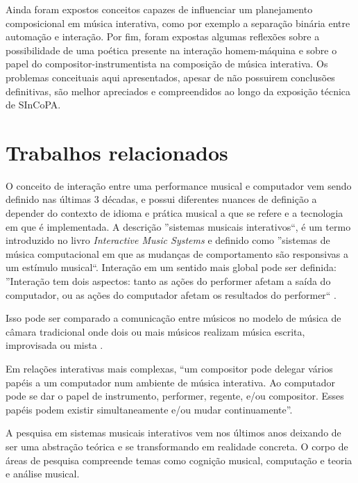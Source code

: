 \documentclass[draft]{ppgmus}
\begin{document}
Ainda foram expostos conceitos capazes de influenciar um planejamento
composicional em música interativa, como por exemplo a separação binária entre
automação e interação. Por fim, foram expostas algumas reflexões sobre a
possibilidade de uma poética presente na interação homem-máquina e sobre
o papel do compositor-instrumentista na composição de música interativa.
Os problemas conceituais aqui apresentados, apesar de não possuirem
conclusões definitivas, são melhor apreciados e compreendidos ao longo
da exposição técnica de SInCoPA.



\chapter{Trabalhos relacionados}
\label{sec:rev}

O conceito de interação entre uma performance musical e computador vem
sendo definido nas últimas 3 décadas, e possui diferentes nuances de definição
a depender do contexto de idioma e prática musical a que se refere e a tecnologia
em que é implementada. A descrição ''sistemas musicais interativos``, é um
termo introduzido no livro \textit{Interactive Music Systems} 
\cite{rowe93:interactive} e definido como ''sistemas de música 
computacional em que as mudanças de comportamento são responsivas a um
estímulo musical``. Interação em um sentido mais global pode ser definida: 
  ''Interação tem dois aspectos:
tanto as ações do performer afetam a saída do computador, ou as ações do computador
afetam os resultados do performer`` \cite{garnett:2001}.

Isso pode ser comparado a comunicação entre músicos no modelo de  música de 
câmara tradicional onde dois ou mais músicos realizam música escrita, improvisada 
ou mista \cite{winkler93:interactive}.

Em relações interativas mais complexas, ``um compositor pode
delegar vários papéis a um computador num ambiente de música interativa. Ao
computador pode se dar o papel de instrumento, performer, regente, e/ou compositor.
Esses papéis podem existir  simultaneamente e/ou mudar continuamente''\cite{lippe:2002}.



A pesquisa em sistemas musicais interativos vem nos últimos anos
deixando de ser uma abstração teórica e se transformando em realidade
concreta. O corpo de áreas de pesquisa compreende temas como cognição
musical, computação e teoria e análise musical.

\end{document}
